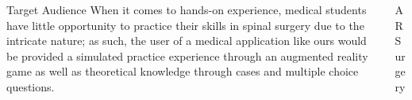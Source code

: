 \documentclass[final]{beamer}
\newlength{\onecolwid}
\begin{document}
\begin{frame}[t]
\begin{columns}[t]
\begin{column}{\onecolwid}


\begin{block}{\LARGE Target Audience}
\large
When it comes to hands-on experience, medical students have little opportunity to practice their skills in spinal surgery due to the intricate nature; as such, the user of a medical application like ours would be provided a simulated practice experience through an augmented reality game as well as theoretical knowledge through cases and multiple choice questions.
\end{block}

\end{column} %

\begin{column}{\onecolwid} %



\begin{block}{\LARGE AR Surgery}


\end{block}
\end{column}
\end{columns}
\end{frame}
\end{document}
